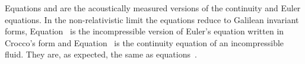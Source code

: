 Equations  and  are the acoustically measured versions of the continuity and Euler equations.
In the non-relativistic limit the equations reduce to Galilean invariant forms, 
Equation~ is the incompressible version of Euler's equation written in Croc\-co's form\cite{Howe1998}
and Equation~ is the continuity equation of an incompressible fluid.
They are, as expected, the same as equations~.




